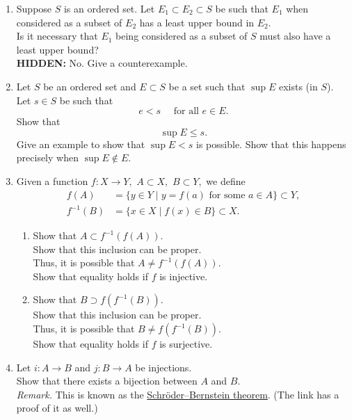 \documentclass[12pt]{article}
\theoremstyle{definition}
\numberwithin{thm}{section}
\newcommand{\hint}[1]{\textbf{HIDDEN:} {\color[rgb]{0.95, 0.95, 0.95}#1}}
\begin{document}
\begin{enumerate}
	\item Suppose $S$ is an ordered set. Let $E_1 \subset E_2 \subset S$ be such that $E_1$ when considered as a subset of $E_2$ has a least upper bound in $E_2.$\\
	Is it necessary that $E_1$ being considered as a subset of $S$ must also have a least upper bound?\\
	\hint{No. Give a counterexample.}
	\item Let $S$ be an ordered set and $E \subset S$ be a set such that $\sup E$ exists (in $S$).\\
	Let $s \in S$ be such that
	\begin{equation*} 
		e < s \quad \text{ for all } e \in E.
	\end{equation*} 
	Show that
	\begin{equation*} 
		\sup E \le s.
	\end{equation*}
	Give an example to show that $\sup E < s$ is possible. Show that this happens precisely when $\sup E \notin E.$
	\item \label{q:funcinvproperties}%
	Given a function $f:X \to Y,$ $A \subset X,$ $B \subset Y,$ we define
	\begin{align*} 
		f(A) &= \{y \in Y \mid y = f(a) \text{ for some } a \in A\} \subset Y,\\
		f^{-1}(B) &= \{x \in X \mid f(x) \in B\} \subset X.
	\end{align*}
	\begin{enumerate}
		\item Show that $A \subset f^{-1}(f(A)).$ \\
		Show that this inclusion can be proper. \\
		Thus, it is possible that $A \neq f^{-1}(f(A)).$ \\
		Show that equality holds if $f$ is injective.
		\item Show that $B \supset f(f^{-1}(B)).$ \\
		Show that this inclusion can be proper. \\
		Thus, it is possible that $B \neq f(f^{-1}(B)).$ \\
		Show that equality holds if $f$ is surjective.
	\end{enumerate}
	\item Let $i:A \to B$ and $j:B\to A$ be injections.\\
	Show that there exists a bijection between $A$ and $B.$\\
	\emph{Remark.} This is known as the \href{https://en.wikipedia.org/wiki/Schr%C3%B6der%E2%80%93Bernstein_theorem}{Schröder–Bernstein theorem}. (The link has a proof of it as well.)

\end{enumerate}
\end{document}
